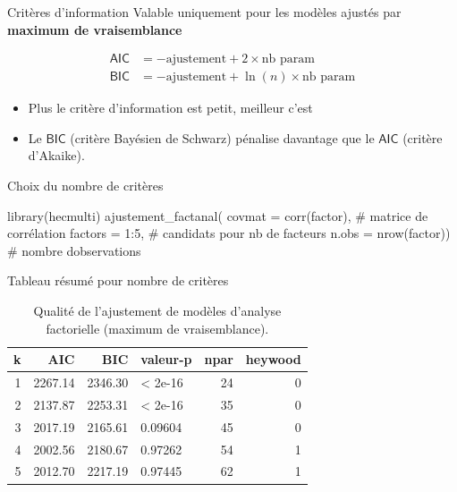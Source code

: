 \documentclass[
  ignorenonframetext,
]{beamer}
\newenvironment{Shaded}{\begin{snugshade}}{\end{snugshade}}
\newcommand{\AttributeTok}[1]{\textcolor[rgb]{0.40,0.45,0.13}{#1}}
\newcommand{\CommentTok}[1]{\textcolor[rgb]{0.37,0.37,0.37}{#1}}
\newcommand{\DecValTok}[1]{\textcolor[rgb]{0.68,0.00,0.00}{#1}}
\newcommand{\FunctionTok}[1]{\textcolor[rgb]{0.28,0.35,0.67}{#1}}
\newcommand{\NormalTok}[1]{\textcolor[rgb]{0.00,0.23,0.31}{#1}}
\newcommand{\SpecialCharTok}[1]{\textcolor[rgb]{0.37,0.37,0.37}{#1}}
\providecommand{\tightlist}{%
  \setlength{\itemsep}{0pt}\setlength{\parskip}{0pt}}\usepackage{longtable,booktabs,array}
\begin{document}
\begin{frame}{Critères d'information}
\protect\hypertarget{crituxe8res-dinformation}{}
Valable uniquement pour les modèles ajustés par \textbf{maximum de
vraisemblance}

\begin{align*}
\mathsf{AIC} &= -\text{ajustement} + 2\times\text{nb param} \\
\mathsf{BIC}&= -\text{ajustement} + \ln(n)\times\text{nb param}
\end{align*}

\begin{itemize}
\tightlist
\item
  Plus le critère d'information est petit, meilleur c'est
\item
  Le \(\mathsf{BIC}\) (critère Bayésien de Schwarz) pénalise davantage
  que le \(\mathsf{AIC}\) (critère d'Akaike).
\end{itemize}
\end{frame}

\begin{frame}[fragile]{Choix du nombre de critères}
\protect\hypertarget{choix-du-nombre-de-crituxe8res}{}
\begin{Shaded}
\begin{Highlighting}[]
\FunctionTok{library}\NormalTok{(hecmulti)}
\FunctionTok{ajustement\_factanal}\NormalTok{(}
    \AttributeTok{covmat =} \FunctionTok{corr}\NormalTok{(factor), }\CommentTok{\# matrice de corrélation}
    \AttributeTok{factors =} \DecValTok{1}\SpecialCharTok{:}\DecValTok{5}\NormalTok{, }\CommentTok{\# candidats pour nb de facteurs}
    \AttributeTok{n.obs =} \FunctionTok{nrow}\NormalTok{(factor)) }\CommentTok{\# nombre d\textquotesingle{}observations}
\end{Highlighting}
\end{Shaded}
\end{frame}

\begin{frame}{Tableau résumé pour nombre de critères}
\protect\hypertarget{tableau-ruxe9sumuxe9-pour-nombre-de-crituxe8res}{}
\hypertarget{tbl-emvcrit}{}
\begin{table}
\caption{\label{tbl-emvcrit}Qualité de l'ajustement de modèles d'analyse factorielle (maximum de
vraisemblance). }\tabularnewline

\centering
\begin{tabular}{rrrlrr}
\toprule
k & AIC & BIC & valeur-p & npar & heywood\\
\midrule
1 & 2267.14 & 2346.30 & < 2e-16 & 24 & 0\\
2 & 2137.87 & 2253.31 & < 2e-16 & 35 & 0\\
3 & 2017.19 & 2165.61 & 0.09604 & 45 & 0\\
4 & 2002.56 & 2180.67 & 0.97262 & 54 & 1\\
5 & 2012.70 & 2217.19 & 0.97445 & 62 & 1\\
\bottomrule
\end{tabular}
\end{table}
\end{frame}
\end{document}
